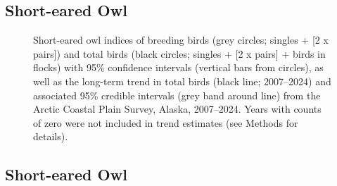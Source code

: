 \documentclass[
]{article}
\begin{document}
\newpage{}

\subsection*{Short-eared Owl}\label{short-eared-owl}

\begin{figure}


\caption{\label{fig-SEOW}Short-eared owl indices of breeding birds (grey
circles; singles + {[}2 x pairs{]}) and total birds (black circles;
singles + {[}2 x pairs{]} + birds in flocks) with 95\% confidence
intervals (vertical bars from circles), as well as the long-term trend
in total birds (black line; 2007--2024) and associated 95\% credible
intervals (grey band around line) from the Arctic Coastal Plain Survey,
Alaska, 2007--2024. Years with counts of zero were not included in trend
estimates (see Methods for details).}

\end{figure}%

\newpage{}

\subsection*{Short-eared Owl}\label{short-eared-owl-1}

\begingroup\fontsize{10}{12}\selectfont
\end{document}
